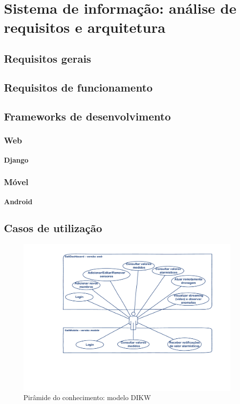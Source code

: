 \chapter{Sistema de informação: análise de requisitos e arquitetura}





\section{Requisitos gerais}



\section{Requisitos de funcionamento}



\section{Frameworks de desenvolvimento}


\subsection{Web}

\subsubsection{Django}



\subsection{Móvel}

\subsubsection{Android }



\section{Casos de utilização}



\begin{figure}[!htb]
	\centering
	\includegraphics[scale=0.5]{esquemas/usecases.pdf}
	\caption{Pirâmide do conhecimento: modelo DIKW}
	\label{dikw}
\end{figure}

